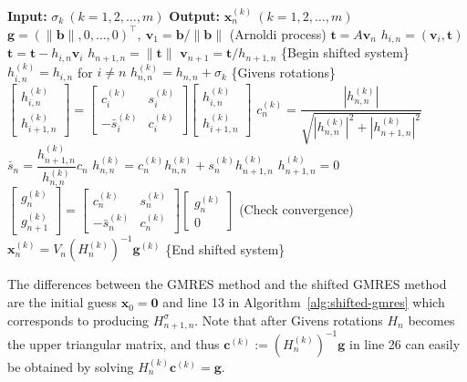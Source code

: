 \begin{algorithm}[H]\caption{{The shifted GMRES method}}\label{alg:shifted-gmres}\begin{algorithmic}[1]
\Statex\textbf{Input:} $\sigma_k\ (k=1,2,\ldots,m)$
\Statex\textbf{Output:} $\bm x_n^{(k)}\ (k=1,2,\ldots,m)$
\State $\bm g=(\|\bm b\|,0,\ldots,0)^{\top},\ \bm v_1=\bm b/\|\bm b\|$
\State ({Arnoldi process})
\State $\bm t=A\bm v_n$
\State $h_{i,n}=(\bm v_i,\bm t)$
\State $\bm t=\bm t-h_{i,n}\bm v_i$
\EndFor
\State $h_{n+1,n}=\|\bm t\|$
\State $\bm v_{n+1}=\bm t/h_{n+1,n}$
\State \{{Begin shifted system}\}
\State $h_{i,n}^{(k)}=h_{i,n}$ {for} $i\ne n$
\State $h_{n,n}^{(k)}=h_{n,n}+\sigma_k$
\State \{{Givens rotations}\}
\State $\begin{bmatrix}h_{i,n}^{(k)}\\h_{i+1,n}^{(k)}\end{bmatrix}=\begin{bmatrix}c_i^{(k)}&s_i^{(k)}\\-\bar s_i^{(k)}&c_i^{(k)}\end{bmatrix}\begin{bmatrix}h_{i,n}^{(k)}\\h_{i+1,n}^{(k)}\end{bmatrix}$
\EndFor
\State $c_n^{(k)}=\dfrac{|h_{n,n}^{(k)}|}{\sqrt{|h_{n,n}^{(k)}|^2+|h_{n+1,n}^{(k)}|^2}}$
\State $\bar s_n=\dfrac{h_{n+1,n}^{(k)}}{h_{n,n}^{(k)}}c_n$
\State $h_{n,n}^{(k)}=c_n^{(k)}h_{n,n}^{(k)}+s_n^{(k)}h_{n+1,n}^{(k)}$
\State $h_{n+1,n}^{(k)}=0$
\State $\begin{bmatrix}g_n^{(k)}\\g_{n+1}^{(k)}\end{bmatrix}=\begin{bmatrix}c_n^{(k)}&s_n^{(k)}\\-\bar s_n^{(k)}&c_n^{(k)}\end{bmatrix}\begin{bmatrix}g_n^{(k)}\\0\end{bmatrix}$
\State ({Check convergence})
\State $\bm x_n^{(k)}=V_n(H_n^{(k)})^{-1}\bm g^{(k)}$
\EndIf\EndFor
\State \{{End shifted system}\}
\EndFor\end{algorithmic}\end{algorithm}
{The differences between the GMRES method and the shifted GMRES method are the initial guess $\bm x_0=\bm0$ and line 13 in Algorithm\ \ref{alg:shifted-gmres} which corresponds to producing $H_{n+1,n}^{\sigma}$. Note that after Givens rotations $H_n$ becomes the upper triangular matrix, and thus $\bm c^{(k)}:=(H_n^{(k)})^{-1}\bm g$ in line 26 can easily be obtained by solving $H_n^{(k)}\bm c^{(k)}=\bm g$.}
